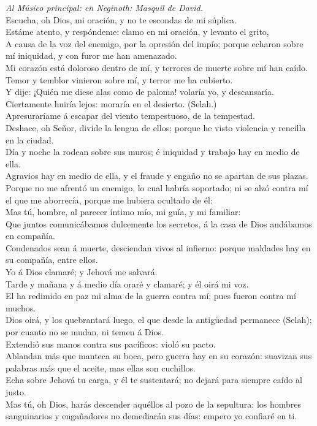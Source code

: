  \emph{Al Músico principal: en Neginoth: Masquil de
David.}\\
Escucha, oh Dios, mi oración, y no te escondas de mi súplica.\\
 Estáme atento, y respóndeme: clamo en mi oración, y levanto
el grito,\\
 A causa de la voz del enemigo, por la opresión del impío;
porque echaron sobre mí iniquidad, y con furor me han amenazado.\\
 Mi corazón está doloroso dentro de mí, y terrores de muerte
sobre mí han caído.\\
 Temor y temblor vinieron sobre mí, y terror me ha
cubierto.\\
 Y dije: ¡Quién me diese alas como de paloma! volaría yo, y
descansaría.\\
 Ciertamente huiría lejos: moraría en el desierto.
(Selah.)\\
 Apresuraríame á escapar del viento tempestuoso, de la
tempestad.\\
 Deshace, oh Señor, divide la lengua de ellos; porque he
visto violencia y rencilla en la ciudad.\\
 Día y noche la rodean sobre sus muros; é iniquidad y
trabajo hay en medio de ella.\\
 Agravios hay en medio de ella, y el fraude y engaño no se
apartan de sus plazas.\\
 Porque no me afrentó un enemigo, lo cual habría soportado;
ni se alzó contra mí el que me aborrecía, porque me hubiera ocultado de
él:\\
 Mas tú, hombre, al parecer íntimo mío, mi guía, y mi
familiar:\\
 Que juntos comunicábamos dulcemente los secretos, á la
casa de Dios andábamos en compañía.\\
 Condenados sean á muerte, desciendan vivos al infierno:
porque maldades hay en su compañía, entre ellos.\\
 Yo á Dios clamaré; y Jehová me salvará.\\
 Tarde y mañana y á medio día oraré y clamaré; y él oirá mi
voz.\\
 El ha redimido en paz mi alma de la guerra contra mí; pues
fueron contra mí muchos.\\
 Dios oirá, y los quebrantará luego, el que desde la
antigüedad permanece (Selah); por cuanto no se mudan, ni temen á Dios.\\
 Extendió sus manos contra sus pacíficos: violó su pacto.\\
 Ablandan más que manteca su boca, pero guerra hay en su
corazón: suavizan sus palabras más que el aceite, mas ellas son
cuchillos.\\
 Echa sobre Jehová tu carga, y él te sustentará; no dejará
para siempre caído al justo.\\
 Mas tú, oh Dios, harás descender aquéllos al pozo de la
sepultura: los hombres sanguinarios y engañadores no demediarán sus
días: empero yo confiaré en ti.


